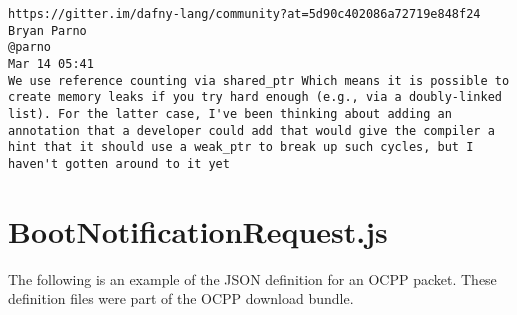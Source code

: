 \documentclass[12pt,openany,a4paper]{book}
\begin{document}
\label{dafnybug2}
\begin{verbatim}
https://gitter.im/dafny-lang/community?at=5d90c402086a72719e848f24
Bryan Parno
@parno
Mar 14 05:41
We use reference counting via shared_ptr Which means it is possible to create memory leaks if you try hard enough (e.g., via a doubly-linked list). For the latter case, I've been thinking about adding an annotation that a developer could add that would give the compiler a hint that it should use a weak_ptr to break up such cycles, but I haven't gotten around to it yet
\end{verbatim}

\chapter{BootNotificationRequest.js}
The following is an example of the JSON definition for an OCPP packet. These definition files were part of the OCPP download bundle.
\label{bootnotificationrequest.json}
\end{document}
